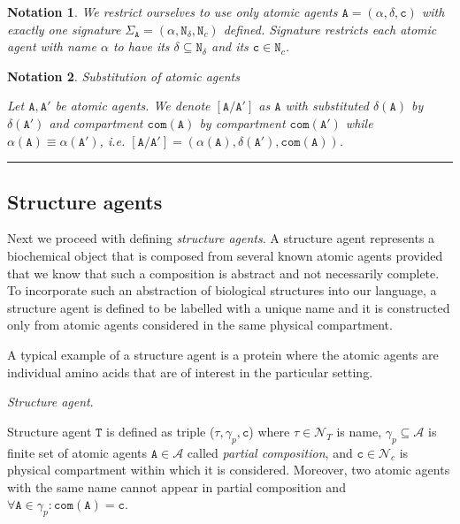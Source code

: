 \documentclass{elsarticle}
\newtheorem{notation}{Notation}
\begin{document}
\begin{notation}
We restrict ourselves to use only atomic agents $\mathtt{A} = (\alpha, \delta, \mathtt{c})$ with exactly one signature $\Sigma_\mathtt{A} = (\alpha, \mathtt{N}_\delta, \mathtt{N}_c)$ defined. Signature restricts each atomic agent with name $\alpha$ to have its $\delta \subseteq \mathtt{N}_\delta$ and its $\mathtt{c} \in \mathtt{N}_c$.
\end{notation}

\begin{notation}
\textit{Substitution of atomic agents}

Let $\mathtt{A}, \mathtt{A}'$ be atomic agents. We denote $[\mathtt{A}/\mathtt{A}']$ 
as $\mathtt{A}$ with substituted $\delta(\mathtt{A})$ by $\delta(\mathtt{A}')$ and compartment $\mathtt{com}(\mathtt{A})$ by compartment $\mathtt{com}(\mathtt{A}')$ while $\alpha(\mathtt{A}) \equiv \alpha(\mathtt{A}')$, i.e. $[\mathtt{A}/\mathtt{A}'] = (\alpha(\mathtt{A}), \delta(\mathtt{A}'), \mathtt{com}(\mathtt{A}))$.
\end{notation}

\noindent\rule{\textwidth}{1pt}


\subsection{Structure agents}

Next we proceed with defining \emph{structure agents}. A structure agent represents a biochemical object that is composed from several known atomic agents provided that we know that such a composition is abstract and not necessarily complete. To incorporate such an abstraction of biological structures into our language, a structure agent is defined to be labelled with a unique name and it is constructed only from atomic agents considered in the same physical compartment. 

A typical example of a structure agent is a protein where the atomic agents are individual amino acids that are of interest in the particular setting.

\begin{definition}
\textit{Structure agent}.

\noindent Structure agent $\mathtt{T}$ is defined as triple ($\tau, \gamma_p, \mathtt{c}$) where $\tau \in \mathcal{N}_{T}$ is name, $\gamma_p \subseteq \mathcal{A}$ is finite set of atomic agents $\mathtt{A} \in \mathcal{A}$ called \emph{partial composition}, and $\mathtt{c} \in \mathcal{N}_{c}$ is physical compartment within which it is considered. Moreover, two atomic agents with the same name cannot appear in partial composition and $\forall \mathtt{A} \in \gamma_p: \mathtt{com}(\mathtt{A}) = \mathtt{c}$.
\end{definition}
\end{document}
